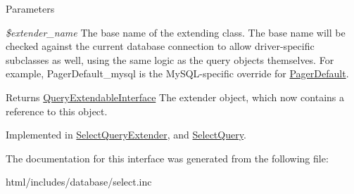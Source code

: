 \begin{DoxyParams}{Parameters}
\item[{\em \$extender\_\-name}]The base name of the extending class. The base name will be checked against the current database connection to allow driver-\/specific subclasses as well, using the same logic as the query objects themselves. For example, PagerDefault\_\-mysql is the MySQL-\/specific override for \hyperlink{classPagerDefault}{PagerDefault}. \end{DoxyParams}
\begin{DoxyReturn}{Returns}
\hyperlink{interfaceQueryExtendableInterface}{QueryExtendableInterface} The extender object, which now contains a reference to this object. 
\end{DoxyReturn}


Implemented in \hyperlink{classSelectQueryExtender_aff046880c8c40a7037f1cade3f765666}{SelectQueryExtender}, and \hyperlink{classSelectQuery_ab401a1ee7ce9ea726cf3856297a46532}{SelectQuery}.

The documentation for this interface was generated from the following file:\begin{DoxyCompactItemize}
\item 
html/includes/database/select.inc\end{DoxyCompactItemize}
